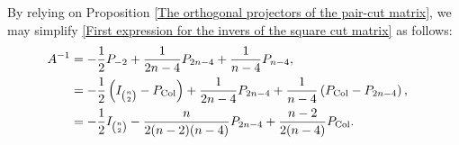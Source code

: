 \documentclass[12pt]{amsart}
\numberwithin{theorem}{section}
\theoremstyle{remark}
\begin{document}
By relying on Proposition \ref{The orthogonal projectors of the pair-cut matrix}, we may simplify \eqref{First expression for the invers of the square cut matrix} as follows:
\begin{align} \label{Second expression for the invers of the square cut matrix}
A^{-1} & = -\frac{1}{2}P_{-2} +\frac{1}{2n-4}P_{2n-4}+\frac{1}{n-4}P_{n-4},	\cr
& = -\frac{1}{2} \left(I_{n\choose 2} - P_{\text{Col}}\right) +\frac{1}{2n-4} P_{2n-4} +\frac{1}{n-4} \left( P_{\text{Col}} - P_{2n-4}\right), \cr
& = -\frac{1}{2} I_{n\choose 2} -\frac{n}{2(n-2)(n-4)} P_{2n-4} + \frac{n-2}{2(n-4)} P_{\text{Col}}.
\end{align}
\end{document}
